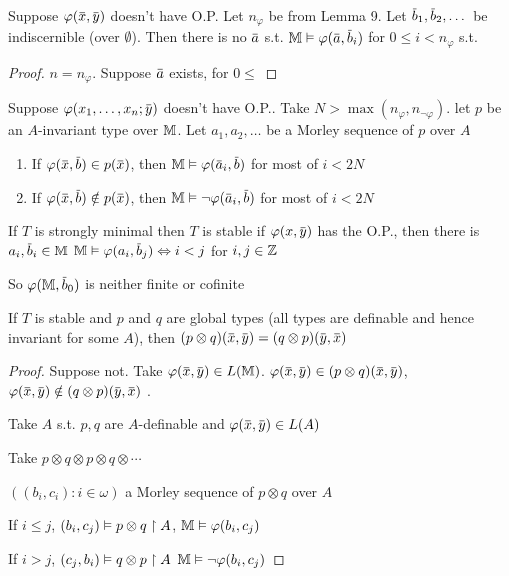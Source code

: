 \documentclass[11pt]{article}
\begin{document}
\begin{lemma}[]
Suppose \(\varphi(\barx,\bary)\) doesn't have O.P. Let \(n_\varphi\) be from Lemma 9.
Let \(\barb_1,\barb_2,\dots\) be indiscernible (over \(\emptyset\)). Then there is no \(\bara\)
s.t. \(\M\vDash\varphi(\bara,\barb_i)\) for \(0\le i<n_\varphi\) s.t.
\end{lemma}

\begin{proof}
\(n=n_\varphi\). Suppose \(\bara\) exists, for \(0\le\)
\end{proof}

\begin{lemma}[]
Suppose \(\varphi(x_1,\dots,x_n;\bary)\) doesn't have O.P.. Take \(N>\max(n_\varphi,n_{\neg\varphi})\). let \(p\) be
an \(A\)-invariant type over \(\mathbb{M}\). Let \(a_1,a_2,\dots\) be a Morley sequence of \(p\) over \(A\)
\begin{enumerate}
\item If \(\varphi(\barx,\barb)\in p(\barx)\), then \(\M\vDash\varphi(\bara_i,\barb)\) for most of \(i<2N\)
\item If \(\varphi(\barx,\barb)\notin p(\barx)\), then \(\M\vDash\neg\varphi(\bara_i,\barb)\) for most of \(i<2N\)
\end{enumerate}
\end{lemma}

\begin{examplle}[]
If \(T\) is strongly minimal then \(T\) is stable if \(\varphi(x,\bary)\) has the O.P., then there
is \(a_i,\barb_i\in\M\) \(\M\vDash\varphi(a_i,\barb_j)\Leftrightarrow i<j\) for \(i,j\in\mathbb{Z}\)

So \(\varphi(\M,\barb_0)\) is neither finite or cofinite
\end{examplle}

\begin{theorem}[]
If \(T\) is stable and \(p\) and \(q\) are global types (all types are definable and hence
invariant for some \(A\)), then \((p\otimes q)(\barx,\bary)=(q\otimes p)(\bary,\barx)\)
\end{theorem}

\begin{proof}
Suppose not.
Take
\(\varphi(\barx,\bary)\in L(\M)\).
\(\varphi(\barx,\bary)\in(p\otimes q)(\barx,\bary)\), \(\varphi(\barx,\bary)\notin(q\otimes p)(\bary,\barx)\) .

Take \(A\) s.t. \(p,q\) are \(A\)-definable and \(\varphi(\barx,\bary)\in L(A)\)

Take \(p\otimes q\otimes p\otimes q\otimes\cdots\)

\(((b_i,c_i):i\in\omega)\) a Morley sequence of \(p\otimes q\) over \(A\)

If \(i\le j\), \((b_i,c_j)\vDash p\otimes q\upharpoonright A\), \(\mathbb{M}\vDash\varphi(b_i,c_j)\)

If \(i>j\), \((c_j,b_i)\vDash q\otimes p\upharpoonright A\) \(\mathbb{M}\vDash\neg\varphi(b_i,c_j)\)
\end{proof}
\end{document}

